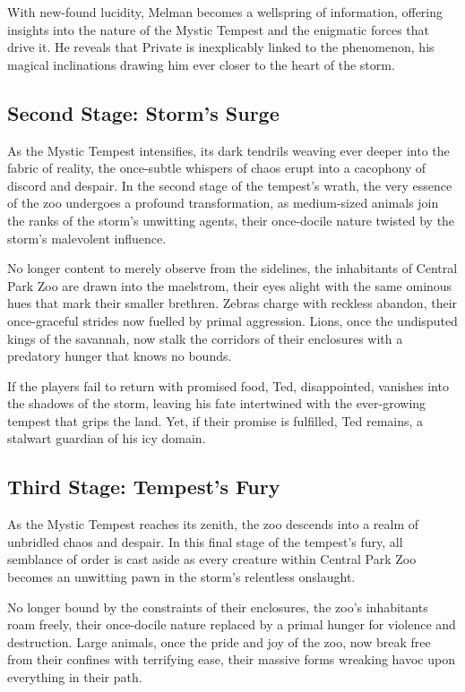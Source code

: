 With new-found lucidity, Melman becomes a wellspring of information, offering insights into the nature of the Mystic Tempest and the enigmatic forces that drive it. He reveals that Private is inexplicably linked to the phenomenon, his magical inclinations drawing him ever closer to the heart of the storm.

\subsection*{Second Stage: Storm's Surge}
As the Mystic Tempest intensifies, its dark tendrils weaving ever deeper into the fabric of reality, the once-subtle whispers of chaos erupt into a cacophony of discord and despair. In the second stage of the tempest's wrath, the very essence of the zoo undergoes a profound transformation, as medium-sized animals join the ranks of the storm's unwitting agents, their once-docile nature twisted by the storm's malevolent influence.

No longer content to merely observe from the sidelines, the inhabitants of Central Park Zoo are drawn into the maelstrom, their eyes alight with the same ominous hues that mark their smaller brethren. Zebras charge with reckless abandon, their once-graceful strides now fuelled by primal aggression. Lions, once the undisputed kings of the savannah, now stalk the corridors of their enclosures with a predatory hunger that knows no bounds.

If the players fail to return with promised food, Ted, disappointed, vanishes into the shadows of the storm, leaving his fate intertwined with the ever-growing tempest that grips the land. Yet, if their promise is fulfilled, Ted remains, a stalwart guardian of his icy domain.

\subsection*{Third Stage: Tempest's Fury}
As the Mystic Tempest reaches its zenith, the zoo descends into a realm of unbridled chaos and despair. In this final stage of the tempest's fury, all semblance of order is cast aside as every creature within Central Park Zoo becomes an unwitting pawn in the storm's relentless onslaught.

No longer bound by the constraints of their enclosures, the zoo's inhabitants roam freely, their once-docile nature replaced by a primal hunger for violence and destruction. Large animals, once the pride and joy of the zoo, now break free from their confines with terrifying ease, their massive forms wreaking havoc upon everything in their path.

